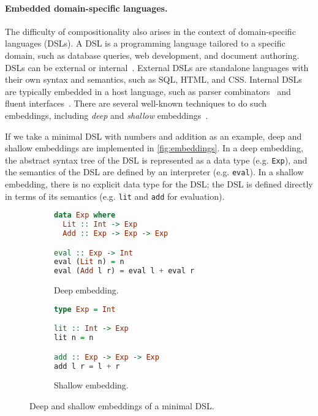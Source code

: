 \paragraph{Embedded domain-specific languages.}
The difficulty of compositionality also arises in the context of domain-specific
languages (DSLs). A DSL is a programming language tailored to a specific domain,
such as database queries, web development, and document authoring. DSLs can be
external or internal~\citep{ghosh2010dsls}. External DSLs are standalone
languages with their own syntax and semantics, such as SQL, HTML, and CSS.
Internal DSLs are typically embedded in a host language, such as parser
combinators~\citep{leijen2001parsec} and fluent
interfaces~\citep{fowler2005fluent}. There are several well-known techniques to
do such embeddings, including \emph{deep} and \emph{shallow}
embeddings~\citep{boulton1992experience}.

If we take a minimal DSL with numbers and addition as an example, deep and
shallow embeddings are implemented in \autoref{fig:embeddings}. In a deep
embedding, the abstract syntax tree of the DSL is represented as a data type
(e.g. \lstinline{Exp}), and the semantics of the DSL are defined by an
interpreter (e.g. \lstinline{eval}). In a shallow embedding, there is no
explicit data type for the DSL; the DSL is defined directly in terms of its
semantics (e.g. \lstinline{lit} and \lstinline{add} for evaluation).

\begin{figure}
\hspace{.06\textwidth}
\begin{subfigure}{.41\textwidth}
\begin{lstlisting}[language=Haskell]
data Exp where
  Lit :: Int -> Exp
  Add :: Exp -> Exp -> Exp

eval :: Exp -> Int
eval (Lit n) = n
eval (Add l r) = eval l + eval r
\end{lstlisting}
\caption{Deep embedding.}
\end{subfigure}
\hspace{.06\textwidth}
\begin{subfigure}{.31\textwidth}
\begin{lstlisting}[language=Haskell]
type Exp = Int

lit :: Int -> Exp
lit n = n

add :: Exp -> Exp -> Exp
add l r = l + r
\end{lstlisting}
\caption{Shallow embedding.}
\end{subfigure}
\caption{Deep and shallow embeddings of a minimal DSL.} \label{fig:embeddings}
\end{figure}

